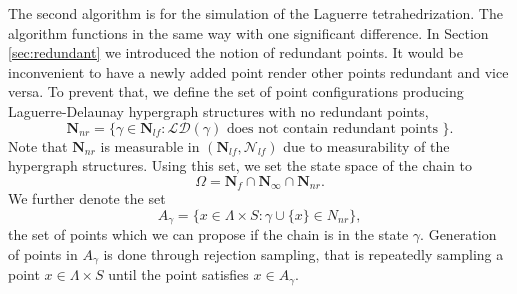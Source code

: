 The second algorithm is for the simulation of the Laguerre tetrahedrization. The algorithm functions in the same way with one significant difference. In Section \ref{sec:redundant} we introduced the notion of redundant points. It would be inconvenient to have a newly added point render other points redundant and vice versa. To prevent that, we define the set of point configurations producing Laguerre-Delaunay hypergraph structures with no redundant points,
$$\mathbf N_{nr} = \{ \gamma \in \mathbf N_{lf}: \mathcal {LD}(\gamma) \text{ does not contain redundant points }\}.$$ 
Note that $\mathbf N_{nr}$ is  measurable in $(\mathbf N_{lf}, \mathcal N_{lf})$ due to measurability of the hypergraph structures.  Using this set, we set the state space of the chain to
$$\Omega = \mathbf N_f \cap \mathbf N_\infty \cap \mathbf N_{nr}.$$
We further denote the set 
$$A_\gamma = \{ x \in \Lambda \times S: \gamma\cup\{x\} \in N_{nr}\},$$
the set of points which we can propose if the chain is in the state $\gamma$. Generation of points in $A_\gamma$ is done through rejection sampling, that is repeatedly sampling a point $x\in \Lambda\times S$ until the point satisfies $x\in A_\gamma$.

